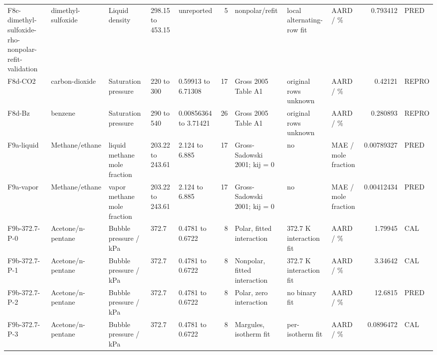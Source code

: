 \begin{landscape}
\begin{longtable}{L{1.9cm}L{2.5cm}L{2.1cm}L{1.6cm}L{1.6cm}rL{2.4cm}L{1.9cm}L{2.2cm}rL{1cm}}
F8c-\allowbreak{}dimethyl-\allowbreak{}sulfoxide-\allowbreak{}rho-\allowbreak{}nonpolar-\allowbreak{}refit-\allowbreak{}validation & dimethyl-\allowbreak{}sulfoxide & Liquid density & 298.15 to 453.15 & unreported & 5 & nonpolar/\allowbreak{}refit & local alternating-\allowbreak{}row fit & AARD /\allowbreak{} \% & 0.793412 & PRED \\
F8d-\allowbreak{}CO2 & carbon-\allowbreak{}dioxide & Saturation pressure & 220 to 300 & 0.59913 to 6.71308 & 17 & Gross 2005 Table A1 & original rows unknown & AARD /\allowbreak{} \% & 0.42121 & REPRO \\
F8d-\allowbreak{}Bz & benzene & Saturation pressure & 290 to 540 & 0.00856364 to 3.71421 & 26 & Gross 2005 Table A1 & original rows unknown & AARD /\allowbreak{} \% & 0.280893 & REPRO \\
F9a-\allowbreak{}liquid & Methane/\allowbreak{}ethane & liquid methane mole fraction & 203.22 to 243.61 & 2.124 to 6.885 & 17 & Gross-\allowbreak{}Sadowski 2001; kij = 0 & no & MAE /\allowbreak{} mole fraction & 0.00789327 & PRED \\
F9a-\allowbreak{}vapor & Methane/\allowbreak{}ethane & vapor methane mole fraction & 203.22 to 243.61 & 2.124 to 6.885 & 17 & Gross-\allowbreak{}Sadowski 2001; kij = 0 & no & MAE /\allowbreak{} mole fraction & 0.00412434 & PRED \\
F9b-\allowbreak{}372.7-\allowbreak{}P-\allowbreak{}0 & Acetone/\allowbreak{}n-\allowbreak{}pentane & Bubble pressure /\allowbreak{} kPa & 372.7 & 0.4781 to 0.6722 & 8 & Polar, fitted interaction & 372.7 K interaction fit & AARD /\allowbreak{} \% & 1.79945 & CAL \\
F9b-\allowbreak{}372.7-\allowbreak{}P-\allowbreak{}1 & Acetone/\allowbreak{}n-\allowbreak{}pentane & Bubble pressure /\allowbreak{} kPa & 372.7 & 0.4781 to 0.6722 & 8 & Nonpolar, fitted interaction & 372.7 K interaction fit & AARD /\allowbreak{} \% & 3.34642 & CAL \\
F9b-\allowbreak{}372.7-\allowbreak{}P-\allowbreak{}2 & Acetone/\allowbreak{}n-\allowbreak{}pentane & Bubble pressure /\allowbreak{} kPa & 372.7 & 0.4781 to 0.6722 & 8 & Polar, zero interaction & no binary fit & AARD /\allowbreak{} \% & 12.6815 & PRED \\
F9b-\allowbreak{}372.7-\allowbreak{}P-\allowbreak{}3 & Acetone/\allowbreak{}n-\allowbreak{}pentane & Bubble pressure /\allowbreak{} kPa & 372.7 & 0.4781 to 0.6722 & 8 & Margules, isotherm fit & per-\allowbreak{}isotherm fit & AARD /\allowbreak{} \% & 0.0896472 & CAL \\

\end{longtable}
\end{landscape}
